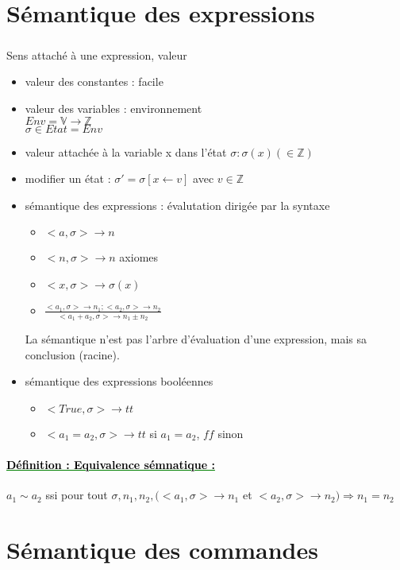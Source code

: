 \documentclass[10pt,a4paper]{article}
\newenvironment{definition}[1]{
	\paragraph{ 	
		\textcolor{green}{
			\underline{ \textcolor{black}{Définition : #1}} } }	} {}
\begin{document}
\section{Sémantique des expressions}
\subparagraph*{} Sens attaché à une expression, valeur
\begin{itemize}
\item valeur des constantes : facile
\item valeur des variables : environnement \\
	$Env = \mathbb{V}\longrightarrow\mathbb{Z}$\\
	$ \sigma \in Etat = Env$ 
\item valeur attachée à la variable x dans l'état $\sigma : \sigma(x) \left( \in \mathbb{Z} \right)$
\item modifier un état : $\sigma ' = \sigma[x \leftarrow v]$ avec $v \in \mathbb{Z}$
\item sémantique des expressions : évalutation dirigée par la syntaxe
	\begin{itemize}
		\item $ <a, \sigma > \rightarrow n$ 
		\item $ <n, \sigma > \rightarrow n$						axiomes
		\item $ <x, \sigma > \rightarrow \sigma(x)$
		\item $\displaystyle \frac{ <a_1, \sigma > \rightarrow n_1 ; <a_2, \sigma > \rightarrow n_2}{<a_1 + a_2, \sigma > \rightarrow n_1 \pm n_2}$
	\end{itemize}
La sémantique n'est pas l'arbre d'évaluation d'une expression, mais sa conclusion (racine).
	\item sémantique des expressions booléennes
		\begin{itemize}
			\item $<True, \sigma > \rightarrow tt$
			\item $<a_1 = a_2,  \sigma > \rightarrow tt$ si $a_1 = a_2$, $ff$ sinon
		\end{itemize}
\end{itemize}
\begin{definition}{Equivalence sémnatique :}
$a_1 \sim a_2$ ssi pour tout $\sigma, n_1, n_2, (<a_1, \sigma> \rightarrow n_1$ et $<a_2, \sigma> \rightarrow n_2 ) \Rightarrow n_1 = n_2$
\end{definition}
\section{Sémantique des commandes}
\end{document}
